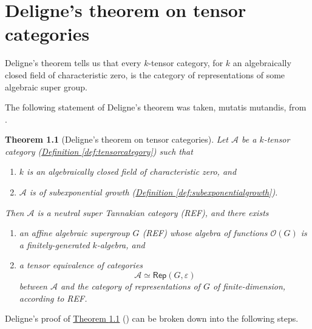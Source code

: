 \documentclass[a4paper,10pt]{scrreprt}
\theoremstyle{definition}
\theoremstyle{plain}
\newtheorem{theorem}{Theorem}[section]
\theoremstyle{remark}
\begin{document}
\chapter{Deligne's theorem on tensor categories}
Deligne's theorem tells us that every $k$-tensor category, for $k$ an algebraically closed field of characteristic zero, is the category of representations of some algebraic super group.

The following statement of Deligne's theorem was taken, mutatis mutandis, from \cite{nlab-deligne-theorem}.

\begin{theorem}[Deligne's theorem on tensor categories]
  \label{thm:delignestheorem}
  Let $\mathscr{A}$ be a $k$-tensor category (\hyperref[def:tensorcategory]{Definition \ref*{def:tensorcategory}}) such that
  \begin{enumerate}
    \item $k$ is an algebraically closed field of characteristic zero, and

    \item $\mathscr{A}$ is of subexponential growth (\hyperref[def:subexponentialgrowth]{Definition \ref*{def:subexponentialgrowth}}).
  \end{enumerate}

  Then $\mathscr{A}$ is a neutral super Tannakian category (REF), and there exists 
  \begin{enumerate}
    \item an affine algebraic supergroup $G$ (REF) whose algebra of functions $\mathscr{O}(G)$ is a finitely-generated $k$-algebra, and 

    \item a tensor equivalence of categories
      \begin{equation*}
        \mathscr{A} \simeq \mathsf{Rep}(G, \varepsilon)
      \end{equation*}
      between $\mathscr{A}$ and the category of representations of $G$ of finite-dimension, according to REF.
  \end{enumerate}
\end{theorem}
Deligne's proof of \hyperref[thm:delignestheorem]{Theorem \ref*{thm:delignestheorem}} (\cite{deligne-categories-tensorielle}) can be broken down into the following steps.
\end{document}
